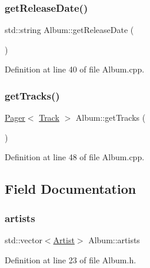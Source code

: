 \subsubsection{\texorpdfstring{get\+Release\+Date()}{getReleaseDate()}}
{\footnotesize\ttfamily std\+::string Album\+::get\+Release\+Date (\begin{DoxyParamCaption}{ }\end{DoxyParamCaption})}



Definition at line 40 of file Album.\+cpp.

\mbox{\label{class_album_a9eb0152eac4b1519bfcf837241b32af1}} 
\subsubsection{\texorpdfstring{get\+Tracks()}{getTracks()}}
{\footnotesize\ttfamily \mbox{\hyperlink{class_pager}{Pager}}$<$ \mbox{\hyperlink{class_track}{Track}} $>$ Album\+::get\+Tracks (\begin{DoxyParamCaption}{ }\end{DoxyParamCaption})}



Definition at line 48 of file Album.\+cpp.



\subsection{Field Documentation}
\mbox{\label{class_album_a78849dfc871f2af6eae2800783b867d3}} 
\subsubsection{\texorpdfstring{artists}{artists}}
{\footnotesize\ttfamily std\+::vector$<$\mbox{\hyperlink{class_artist}{Artist}}$>$ Album\+::artists\hspace{0.3cm}{\ttfamily [private]}}



Definition at line 23 of file Album.\+h.

\mbox{\label{class_album_aa5ad286911b8955fc5c8ea4e98a42b0d}} 
